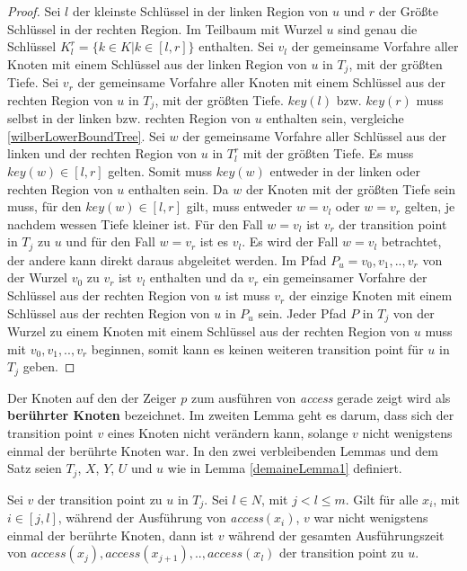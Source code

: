 \documentclass[a4paper,12pt]{article}
\begin{document}
\begin{proof}
	Sei $l$ der kleinste Schlüssel in der linken Region von $u$ und $r$ der Größte Schlüssel in der rechten Region. Im Teilbaum mit Wurzel $u$ sind genau die Schlüssel $K^r_l = \{k \in K \vert k \in \left[l,r\right]\}$ enthalten. Sei $v_l$ der gemeinsame Vorfahre aller Knoten mit einem Schlüssel aus der linken Region von $u$ in $T_j$, mit der größten Tiefe. Sei $v_r$ der gemeinsame Vorfahre aller Knoten mit einem Schlüssel aus der rechten Region von $u$ in $T_j$, mit der größten Tiefe. $\mathit{key\left(l\right)}$ bzw. $\mathit{key\left(r\right)}$ muss selbst in der linken bzw. rechten Region von $u$ enthalten sein, vergleiche \ref{wilberLowerBoundTree}. Sei $w$ der gemeinsame Vorfahre aller Schlüssel aus der linken und der rechten Region von $u$ in $T^r_l$ mit der größten Tiefe. Es muss $\mathit{key}\left(w\right) \in \left[l,r\right]$ gelten. Somit muss  $\mathit{key}\left(w\right)$ entweder in der linken oder rechten Region von $u$ enthalten sein. Da $w$ der Knoten mit der größten Tiefe sein muss, für den  $\mathit{key\left(w\right)} \in \left[l,r\right]$  gilt, muss entweder $w = v_l$ oder $w = v_r$ gelten, je nachdem wessen Tiefe kleiner ist. Für den Fall $w = v_l$ ist $v_r$ der transition point in $T_j$ zu $u$ und für den Fall $w = v_r$ ist es $v_l$.
	Es wird der Fall $w = v_l$ betrachtet, der andere kann direkt daraus abgeleitet werden. Im Pfad $P_u = v_0,v_1,..,v_r$ von der Wurzel $v_0$ zu $v_r$ ist $v_l$ enthalten und da $v_r$ ein gemeinsamer Vorfahre der Schlüssel aus der rechten Region von $u$ ist muss $v_r$ der einzige Knoten mit einem Schlüssel aus der rechten Region von $u$ in $P_u$ sein. Jeder Pfad $P$ in $T_j$ von der Wurzel zu einem Knoten mit einem Schlüssel aus der rechten Region von $u$ muss mit $v_0,v_1,..,v_r$ beginnen, somit kann es keinen weiteren transition point für $u$ in $T_j$ geben. 
	
\end{proof}
\noindent Der Knoten auf den der Zeiger $p$ zum ausführen von \textit{access} gerade zeigt wird als \textbf{berührter Knoten} bezeichnet.
Im zweiten Lemma geht es darum, dass sich der transition point $v$ eines Knoten nicht verändern kann, solange $v$ nicht wenigstens einmal der berührte Knoten war. In den zwei verbleibenden Lemmas und dem Satz seien  $T_j$, $X$, $Y$, $U$ und $u$ wie in  Lemma \ref{demaineLemma1} definiert. 



\begin{Lemma} \label{demaineLemma2} \label{lemmaDemaine2}
	Sei $v$ der transition point zu $u$ in $T_j$.  Sei  $l \in \mathit{N}$, mit $j < l \leq m$. Gilt für alle $x_i$, mit $i \in \left[j,l\right]$, während der Ausführung von \textit{access}$\left(x_i\right)$,  $v$ war nicht wenigstens einmal der berührte Knoten, dann ist $v$ während der gesamten Ausführungszeit von $\textit{access}\left(x_j\right),\textit{access}\left(x_{j+1}\right),..,\textit{access}\left(x_l\right)$ der transition point zu $u$. 
\end{Lemma}
\end{document}
